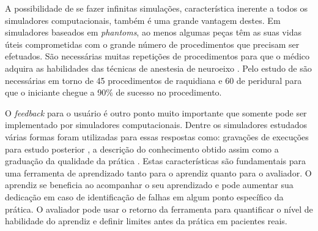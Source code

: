 A possibilidade de se fazer infinitas simulações, característica inerente a todos os simuladores computacionais, também é uma grande vantagem destes. Em simuladores baseados em \textit{phantoms}, ao menos algumas peças têm as suas vidas úteis comprometidas com o grande número de procedimentos que precisam ser efetuados. São necessárias muitas repetições de procedimentos para que o médico adquira as habilidades das técnicas de anestesia de neuroeixo \cite{Konrad1998}. Pelo estudo de \textcite{Kopacz1996} são necessárias em torno de 45 procedimentos de raquidiana e 60 de peridural para que o iniciante chegue a 90\% de sucesso no procedimento. 

O \textit{feedback} para o usuário é outro ponto muito importante que somente pode ser implementado por simuladores computacionais. Dentre os simuladores estudados várias formas foram utilizadas para essas respostas como: gravações de execuções para estudo posterior \cite{Farber2009, Frazzetto2011}, a descrição do conhecimento obtido assim como a graduação da qualidade da prática \cite{Wilson2003, Albert2007, Dreifaldt2006, Brazil2017, Moo-Young202}. Estas características são fundamentais para uma ferramenta de aprendizado tanto para o aprendiz quanto para o avaliador. O aprendiz se beneficia ao acompanhar o seu aprendizado e pode aumentar sua dedicação em caso de identificação de falhas em algum ponto específico da prática. O avaliador pode usar o retorno da ferramenta para quantificar o nível de habilidade do aprendiz e definir limites antes da prática em pacientes reais. 

